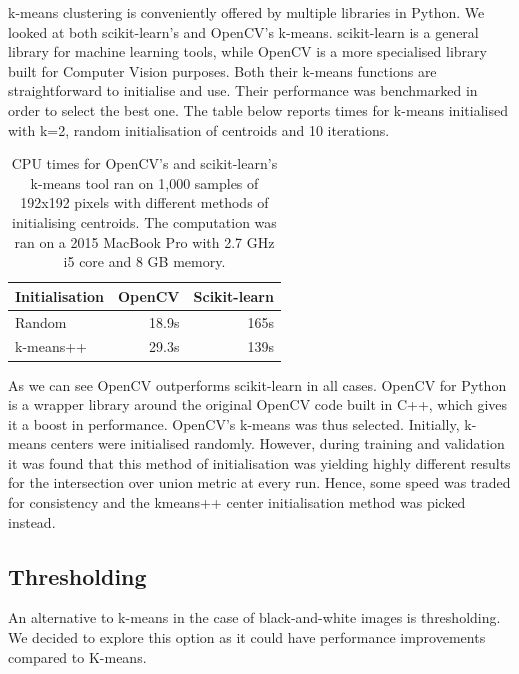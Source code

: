 k-means clustering is conveniently offered by multiple libraries in Python. We looked at both scikit-learn's and OpenCV's k-means. scikit-learn is a general library  for machine learning tools, while OpenCV is a more specialised library built for Computer Vision purposes. Both their k-means functions are straightforward to initialise and use. Their performance was benchmarked in order to select the best one. The table below reports times for k-means initialised with k=2, random initialisation of centroids and 10 iterations.

\begin{table}[h]
\centering
\begin{tabular}{|l|l|l|}
\hline
\textbf{Initialisation} & \textbf{OpenCV} & \textbf{Scikit-learn} \\ \hline
Random                                   & \multicolumn{1}{r|}{18.9s}       & \multicolumn{1}{r|}{165s}              \\ \hline
k-means++                                & \multicolumn{1}{r|}{29.3s}       & \multicolumn{1}{r|}{139s}              \\ \hline
\end{tabular}

\caption{CPU times for OpenCV's and scikit-learn's k-means tool ran on 1,000 samples of 192x192 pixels with different methods of initialising centroids.  The computation was ran on a 2015 MacBook Pro with 2.7 GHz i5 core and 8 GB memory.}
\end{table}

As we can see OpenCV outperforms scikit-learn in all cases. OpenCV for Python is a wrapper library around the original OpenCV code built in C++, which gives it a boost in performance. OpenCV's k-means was thus selected. Initially, k-means centers were initialised randomly. However, during training and validation it was found that this method of initialisation was yielding highly different results for the intersection over union metric at every run. Hence, some speed was traded for consistency and the kmeans++ center initialisation method was picked instead.

\subsection{Thresholding}

An alternative to k-means in the case of black-and-white images is thresholding. We decided to explore this option as it could have performance improvements compared to K-means.

